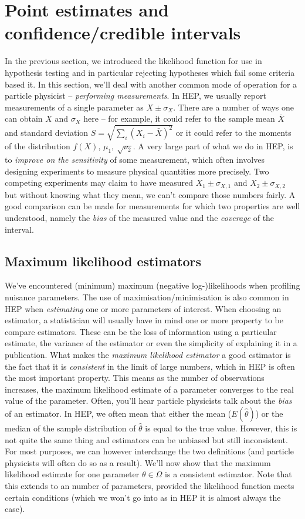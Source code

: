 \section{Point estimates and confidence/credible intervals}

In the previous section, we introduced the likelihood function for use in hypothesis testing and in particular rejecting hypotheses which fail some criteria based it. In this section, we'll deal with another common mode of operation for a particle physicist -- \emph{performing measurements}. In HEP, we usually report measurements of a single parameter as $X\pm\sigma_{X}$. There are a number of ways one can obtain $X$ and $\sigma_{X}$ here -- for example, it could refer to the sample mean $\bar{X}$ and standard deviation $S = \sqrt{\sum_{i}(X_{i}-\bar{X})^{2}}$ or it could refer to the moments of the distribution $f(X)$, $\mu_{1},~\sqrt{\nu_{2}}$. A very large part of what we do in HEP, is to \emph{improve on the sensitivity} of some measurement, which often involves designing experiments to measure physical quantities more precisely. Two competing experiments may claim to have measured  $X_1\pm\sigma_{X,1}$ and $X_2\pm\sigma_{X,2}$ but without knowing what they mean, we can't compare those numbers fairly. A good comparison can be made for measurements for which two properties are well understood, namely the \emph{bias} of the measured value and the \emph{coverage} of the interval. 

\subsection{Maximum likelihood estimators}
We've encountered (minimum) maximum (negative log-)likelihoods when profiling nuisance parameters. The use of maximisation/minimisation is also common in HEP when \emph{estimating} one or more parameters of interest. When choosing an estimator, a statistician will usually have in mind one or more property to be compare estimators. These can be the loss of information using a particular estimate, the variance of the estimator or even the simplicity of explaining it in a publication. What makes the \emph{maximum likelihood estimator} a good estimator is the fact that it is \emph{consistent} in the limit of large numbers, which in HEP is often the most important property. This means as the number of observations increases, the maximum likelihood estimate of a parameter converges to the real value of the parameter. Often, you'll hear particle physicists talk about the \emph{bias} of an estimator. In HEP, we often mean that either the mean ($E(\hat\theta)$) or the median of the sample distribution of $\hat{\theta}$ is equal to the true value. However, this is not quite the same thing and estimators can be unbiased but still inconsistent. For most purposes, we can however interchange the two definitions (and particle physicists will often do so as a result). We'll now show that the maximum likelihood estimate for one parameter $\theta\in\Omega$ is a consistent estimator. Note that this extends to an number of parameters, provided the likelihood function meets certain conditions (which we won't go into as in HEP it is almost always the case). 

